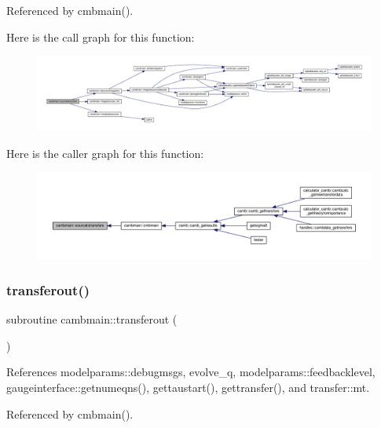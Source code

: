 Referenced by cmbmain().

Here is the call graph for this function\+:
\nopagebreak
\begin{figure}[H]
\begin{center}
\leavevmode
\includegraphics[width=350pt]{namespacecambmain_ad84747dc28d2ff66a818a46c3eb5f574_cgraph}
\end{center}
\end{figure}
Here is the caller graph for this function\+:
\nopagebreak
\begin{figure}[H]
\begin{center}
\leavevmode
\includegraphics[width=350pt]{namespacecambmain_ad84747dc28d2ff66a818a46c3eb5f574_icgraph}
\end{center}
\end{figure}
\mbox{\label{namespacecambmain_a3411884ad6ba8d1584e9dedab9fdab81}} 
\subsubsection{\texorpdfstring{transferout()}{transferout()}}
{\footnotesize\ttfamily subroutine cambmain\+::transferout (\begin{DoxyParamCaption}{ }\end{DoxyParamCaption})\hspace{0.3cm}{\ttfamily [private]}}



References modelparams\+::debugmsgs, evolve\+\_\+q, modelparams\+::feedbacklevel, gaugeinterface\+::getnumeqns(), gettaustart(), gettransfer(), and transfer\+::mt.



Referenced by cmbmain().

